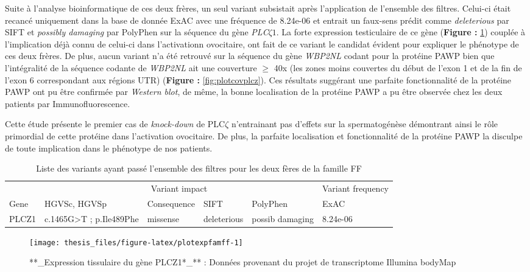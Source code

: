 \documentclass[12pt,twoside]{ugathesis}
\begin{document}
Suite à l'analyse bioinformatique de ces deux frères, un seul variant
subsistait après l'application de l'ensemble des filtres. Celui-ci était
recancé uniquement dans la base de donnée ExAC avec une fréquence de
8.24e-06 et entrait un faux-sens prédit comme \emph{deleterious} par
SIFT et \emph{possibly damaging} par PolyPhen sur la séquence du gène
\emph{PLC}\(\zeta 1\). La forte expression testiculaire de ce gène
(\textbf{Figure : }\ref{fig:plotexpfamff}) couplée à l'implication déjà
connu de celui-ci dans l'activationn ovocitaire, ont fait de ce variant
le candidat évident pour expliquer le phénotype de ces deux frères. De
plus, aucun variant n'a été retrouvé sur la séquence du gène
\emph{WBP2NL} codant pour la protéine PAWP bien que l'intégralité de la
séquence codante de \emph{WBP2NL} ait une couverture \(\ge\) 40x (les
zones moins couvertes du début de l'exon 1 et de la fin de l'exon 6
correspondant aux régions UTR) (\textbf{Figure :
}\ref{fig:plotcovplcz}). Ces résultats suggérant une parfaite
fonctionnalité de la protéine PAWP ont pu être confirmée par
\emph{Western blot}, de même, la bonne localisation de la protéine PAWP
a pu être observée chez les deux patients par Immunofluorescence.

Cette étude présente le premier cas de \emph{knock-down} de PLC\(\zeta\)
n'entrainant pas d'effets sur la spermatogénèse démontrant ainsi le rôle
primordial de cette protéine dans l'activation ovocitaire. De plus, la
parfaite localisation et fonctionnalité de la protéine PAWP la disculpe
de toute implication dans le phénotype de nos patients.

\begin{longtable}[t]{llllll}
\caption{\label{tab:tabrecapff}Liste des variants ayant passé l'ensemble des filtres pour les deux fères de la famille FF}\\
\toprule
\multicolumn{1}{c}{ } & \multicolumn{4}{c}{Variant impact} & \multicolumn{1}{c}{Variant frequency} \\
\cmidrule(l{2pt}r{2pt}){2-5} \cmidrule(l{2pt}r{2pt}){6-6}
Gene & HGVSc, HGVSp & Consequence & SIFT & PolyPhen & ExAC\\
\midrule
PLCZ1 & c.1465G>T ; p.Ile489Phe & missense & deleterious & possib damaging & 8.24e-06\\
\bottomrule
\end{longtable}

\newpage

\begin{figure}

{\centering \texttt{[image: thesis\_files/figure-latex/plotexpfamff-1]} 

}

\caption[Expression tissulaire du gène PLCZ1*]{**\_Expression tissulaire du gène PLCZ1*\_** :
Données provenant du projet de transcriptome Illumina bodyMap}\label{fig:plotexpfamff}
\end{figure}
\end{document}

